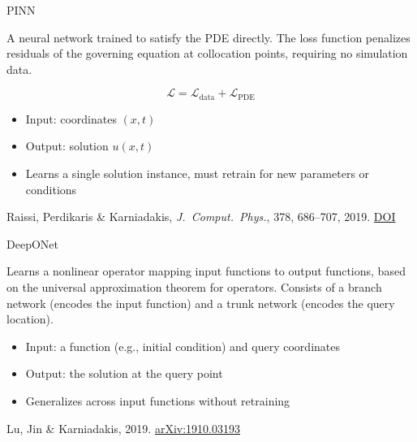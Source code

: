 \documentclass[aspectratio=169]{beamer}
\begin{document}
\begin{frame}{PINN}

  A neural network trained to satisfy the PDE directly. The loss function
  penalizes residuals of the governing equation at collocation points,
  requiring no simulation data.

  \begin{equation*}
    \mathcal{L} = \mathcal{L}_{\text{data}} + \mathcal{L}_{\text{PDE}}
  \end{equation*}

  \begin{itemize}
    \item Input: coordinates $(x, t)$
    \item Output: solution $u(x, t)$
    \item Learns a single solution instance, must retrain for new parameters
      or conditions
  \end{itemize}

  \vfill
  \hfill{\footnotesize Raissi, Perdikaris \& Karniadakis,
    \textit{J.\ Comput.\ Phys.}, 378, 686--707, 2019.
    \href{https://doi.org/10.1016/j.jcp.2018.10.045}{DOI}}

\end{frame}

\begin{frame}{DeepONet}

  Learns a nonlinear operator mapping input functions to output functions,
  based on the universal approximation theorem for operators. Consists of a
  branch network (encodes the input function) and a trunk network (encodes
  the query location).

  \begin{itemize}
    \item Input: a function (e.g., initial condition) and query coordinates
    \item Output: the solution at the query point
    \item Generalizes across input functions without retraining
  \end{itemize}

  \vfill
  \hfill{\footnotesize Lu, Jin \& Karniadakis, 2019.
    \href{https://arxiv.org/abs/1910.03193}{arXiv:1910.03193}}

\end{frame}
\end{document}
